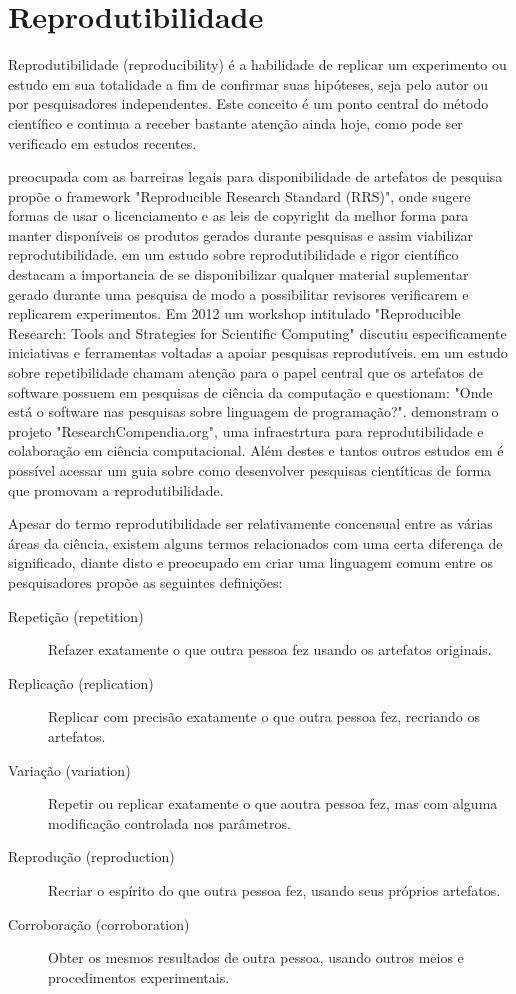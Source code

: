 \documentclass[qual, classic, a4paper]{ufbathesis}
\begin{document}
\section{Reprodutibilidade}

Reprodutibilidade (reproducibility) é a habilidade de replicar um experimento
ou estudo em sua totalidade a fim de confirmar suas hipóteses, seja pelo
autor ou por pesquisadores independentes. Este conceito é um ponto
central do método científico e continua a receber bastante atenção ainda hoje,
como pode ser verificado em estudos recentes.

 preocupada com as barreiras legais para
disponibilidade de artefatos de pesquisa propõe o framework "Reproducible
Research Standard (RRS)", onde sugere formas de usar o licenciamento e as leis
de copyright da melhor forma para manter disponíveis os produtos gerados
durante pesquisas e assim viabilizar reprodutibilidade. 
em um estudo sobre reprodutibilidade e rigor científico destacam a importancia
de se disponibilizar qualquer material suplementar gerado durante uma pesquisa
de modo a possibilitar revisores verificarem e replicarem experimentos. Em
2012 um workshop intitulado "Reproducible Research: Tools and Strategies for
Scientific Computing" \cite{Stodden2012} discutiu especificamente iniciativas
e ferramentas voltadas a apoiar pesquisas reprodutíveis.
 em um estudo sobre repetibilidade chamam
atenção para o papel central que os artefatos de software possuem em pesquisas
de ciência da computação e questionam: "Onde está o software nas pesquisas
sobre linguagem de programação?".  demonstram o
projeto "ResearchCompendia.org", uma infraestrtura para reprodutibilidade e
colaboração em ciência computacional. Além destes e tantos outros estudos em
\cite{GithubReproducibilityGuide} é possível acessar um guia sobre como
desenvolver pesquisas cientíticas de forma que promovam a reprodutibilidade.

Apesar do termo reprodutibilidade ser relativamente concensual entre as várias
áreas da ciência, existem alguns termos relacionados com uma certa diferença
de significado, diante disto e preocupado em criar uma linguagem comum entre
os pesquisadores  propõe as seguintes definições:

\begin{description}
  \item[Repetição (repetition)] Refazer exatamente o que outra pessoa fez usando os artefatos originais.
  \item[Replicação (replication)] Replicar com precisão exatamente o que outra pessoa fez, recriando os artefatos.
  \item[Variação (variation)] Repetir ou replicar exatamente o que aoutra pessoa fez, mas com alguma modificação controlada nos parâmetros.
  \item[Reprodução (reproduction)] Recriar o espírito do que outra pessoa fez, usando seus próprios artefatos.
  \item[Corroboração (corroboration)] Obter os mesmos resultados de outra pessoa, usando outros meios e procedimentos experimentais.
\end{description}
\end{document}
